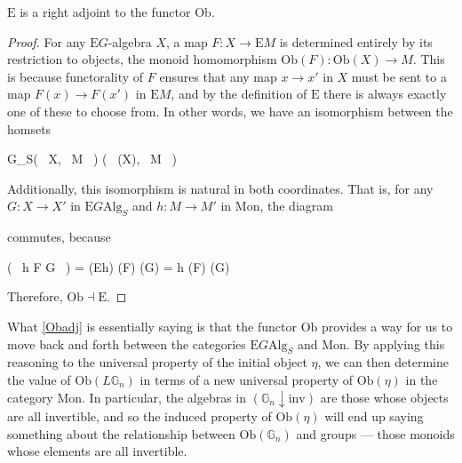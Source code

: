 \begin{prop}\label{Obadj} $\mathrm{E}$ is a right adjoint to the functor $\mathrm{Ob}$. 
\end{prop}
\begin{proof}
For any $\mathrm{E}G$-algebra $X$, a map $F: X \to \mathrm{E}M$ is determined entirely by its restriction to objects, the monoid homomorphism $\mathrm{Ob}(F) : \mathrm{Ob}(X) \to M$. This is because functorality of $F$ ensures that any map $x \to x'$ in $X$ must be sent to a map $F(x) \to F(x')$ in $\mathrm{E}M$, and by the definition of $\mathrm{E}$ there is always exactly one of these to choose from. In other words, we have an isomorphism between the homsets
\begin{eq*} G_S( \, X, \, M \, ) \quad \cong \quad {}( \, (X), \, M \, ) \end{eq*}
Additionally, this isomorphism is natural in both coordinates. That is, for any $G: X \to X'$ in $\mathrm{E}G\mathrm{Alg}_S$ and $h : M \to M'$ in $\mathrm{Mon}$, the diagram
\begin{eq*}  \end{eq*}
commutes, because
\begin{eq*} ( \, h \circ F \circ G \, ) \quad = \quad {}(Eh) \circ {}(F) \circ {}(G) \quad = \quad h \circ {}(F) \circ {}(G) \end{eq*}
Therefore, $\mathrm{Ob} \dashv \mathrm{E}$.
\end{proof}

What \cref{Obadj} is essentially saying is that the functor $\mathrm{Ob}$ provides a way for us to move back and forth between the categories $\mathrm{E}G\mathrm{Alg}_S$ and $\mathrm{Mon}$. By applying this reasoning to the universal property of the initial object $\eta$, we can then determine the value of $\mathrm{Ob}(L\mathbb{G}_n)$ in terms of a new universal property of $\mathrm{Ob}(\eta)$ in the category $\mathrm{Mon}$. In particular, the algebras in $(\mathbb{G}_n \downarrow \mathrm{inv})$ are those whose objects are all invertible, and so the induced property of $\mathrm{Ob}(\eta)$ will end up saying something about the relationship between $\mathrm{Ob}(\mathbb{G}_n)$ and groups --- those monoids whose elements are all invertible.

